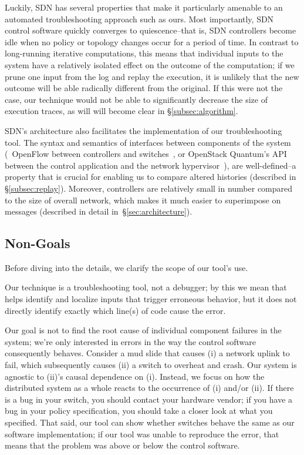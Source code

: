 Luckily, SDN has several properties that make it particularly amenable to an
automated troubleshooting approach such as ours. Most importantly, SDN control software
quickly converges to quiescence--that is, SDN controllers become idle when no policy or
topology changes occur for a period of time. In contrast to long-running iterative computations,
this means that individual inputs to the system have a relatively isolated effect on the outcome
of the computation; if we prune one input from the log and replay the execution, it is unlikely
that the new outcome will be able radically different from the original. If this were not the case, our
technique would not be able to significantly decrease the size of execution traces, as will will become clear in
\S\ref{subsec:algorithm}.

SDN's architecture also facilitates the implementation of our troubleshooting
tool. The syntax and semantics of interfaces between components of the system (\eg~OpenFlow
between controllers and switches~\cite{openflow}, or
OpenStack Quantum's API between
the control application and the network hypervisor~\cite{quantum}), are
well-defined--a property that is crucial for
enabling us to compare altered histories (described in \S\ref{subsec:replay}).
Moreover, controllers are relatively small in number compared to the size of
overall network, which makes it much easier to superimpose
on messages (described in detail in~\S\ref{sec:architecture}).

\subsection{Non-Goals}
\label{subsec:non_goals}

Before diving into the
details, we clarify the scope of our tool's use.

 Our technique is a troubleshooting tool, not a debugger;
by this we mean that \simulator{} helps identify and localize inputs that
trigger erroneous behavior, but it does not directly identify exactly which
line(s) of code cause the error.

 Our goal is not to find the root
cause of individual component failures in the system; we're only interested in
errors in the way the control software consequently behaves.
Consider a mud slide that causes (i) a network uplink to fail, which subsequently
causes (ii) a switch to overheat and crash. Our
system is agnostic to (ii)'s causal dependence on (i). Instead, we focus on
how the distributed system as a whole reacts to the occurrence of (i) and/or (ii).
If there is a bug in your switch, you should contact your hardware vendor;
if you have a bug in your policy specification, you should take a closer look at what you specified.
That said, our tool can show whether switches behave the same as our software
implementation; if our tool was unable to reproduce the error, that means that
the problem was above or below the control software.

